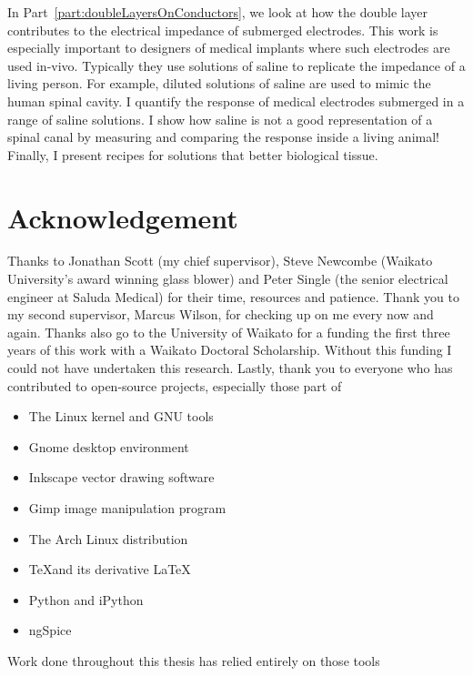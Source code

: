  In Part~\ref{part:doubleLayersOnConductors}, we look at how the double layer contributes to the electrical impedance of submerged electrodes.
  This work is especially important to designers of medical implants where such electrodes are used in-vivo.
  Typically they use solutions of saline to replicate the impedance of a living person.
  For example, diluted solutions of saline are used to mimic the human spinal cavity.
  I quantify the response of medical electrodes submerged in a range of saline solutions.
  I show how saline is not a good representation of a spinal canal by measuring and comparing the response inside a living animal!
  Finally, I present recipes for solutions that better biological tissue.


\chapter*{Acknowledgement}
Thanks to Jonathan Scott (my chief supervisor), Steve Newcombe (Waikato University's award winning glass blower) and Peter Single (the senior electrical engineer at Saluda Medical) for their time, resources and patience.
Thank you to my second supervisor, Marcus Wilson, for checking up on me every now and again.
Thanks also go to the University of Waikato for a funding the first three years of this work with a Waikato Doctoral Scholarship.
Without this funding I could not have undertaken this research.
Lastly, thank you to everyone who has contributed to open-source projects, especially those part of
\begin{itemize}
\item The Linux kernel and GNU tools
\item Gnome desktop environment
\item Inkscape vector drawing software
\item Gimp image manipulation program
\item The Arch Linux distribution
\item \TeX \space and its derivative \LaTeX
\item Python and iPython
\item ngSpice
\end{itemize}
Work done throughout this thesis has relied entirely on those tools

\tableofcontents{}
\listoffigures
\listoftables
\doublespacing


